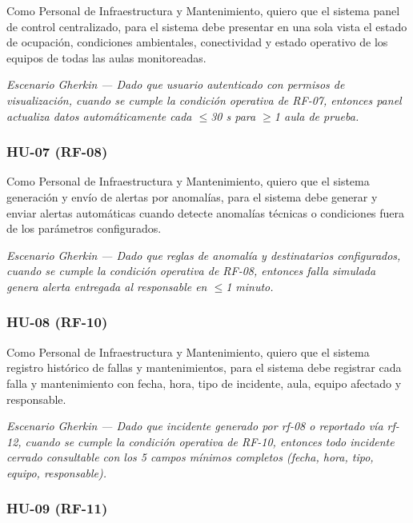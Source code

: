 
Como Personal de Infraestructura y Mantenimiento, quiero que el sistema panel de control centralizado, para el sistema debe presentar en una sola vista el estado de ocupación, condiciones ambientales, conectividad y estado operativo de los equipos de todas las aulas monitoreadas.


\textit{Escenario }\textit{Gherkin}\textit{ --- Dado que usuario autenticado con permisos de visualización, cuando se cumple la condición operativa de RF-07, entonces panel actualiza datos automáticamente cada $\leq$30 s para $\geq$1 aula de prueba.}


\subsubsection*{HU-07 (RF-08)}


Como Personal de Infraestructura y Mantenimiento, quiero que el sistema generación y envío de alertas por anomalías, para el sistema debe generar y enviar alertas automáticas cuando detecte anomalías técnicas o condiciones fuera de los parámetros configurados.


\textit{Escenario }\textit{Gherkin}\textit{ --- Dado que reglas de anomalía y destinatarios configurados, cuando se cumple la condición operativa de RF-08, entonces falla simulada genera alerta entregada al responsable en $\leq$1 minuto.}


\subsubsection*{HU-08 (RF-10)}


Como Personal de Infraestructura y Mantenimiento, quiero que el sistema registro histórico de fallas y mantenimientos, para el sistema debe registrar cada falla y mantenimiento con fecha, hora, tipo de incidente, aula, equipo afectado y responsable.


\textit{Escenario }\textit{Gherkin}\textit{ --- Dado que incidente generado por rf-08 o reportado vía rf-12, cuando se cumple la condición operativa de RF-10, entonces todo incidente cerrado consultable con los 5 campos mínimos completos (fecha, hora, tipo, equipo, responsable).}


\subsubsection*{HU-09 (RF-11)}

